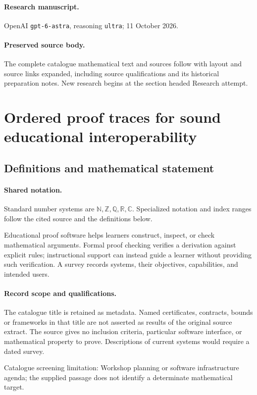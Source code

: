 \documentclass[11pt]{article}
\begin{document}
\paragraph{Research manuscript.} OpenAI \texttt{gpt-6-astra}, reasoning \texttt{ultra}; 11 October 2026.
\paragraph{Preserved source body.} The complete catalogue mathematical text and sources follow with layout and source links expanded, including source qualifications and its historical preparation notes. New research begins at the section headed Research attempt.

\section{Ordered proof traces for sound educational interoperability}\label{statement}

\subsection{Definitions and mathematical statement}

\paragraph{Shared notation.}Standard number systems are $\mathbb N,\mathbb Z,\mathbb Q,\mathbb R,\mathbb C$. Specialized notation and index ranges follow the cited source and the definitions below.


Educational proof software helps learners construct, inspect, or check mathematical arguments. Formal proof checking verifies a derivation against explicit rules; instructional support can instead guide a learner without providing such verification. A survey records systems, their objectives, capabilities, and intended users.
\paragraph{Record scope and qualifications.}
The catalogue title is retained as metadata. Named certificates, contracts, bounds or frameworks in that title are not asserted as results of the original source extract.
The source gives no inclusion criteria, particular software interface, or mathematical property to prove. Descriptions of current systems would require a dated survey.

Catalogue screening limitation: Workshop planning or software infrastructure agenda; the supplied passage does not identify a determinate mathematical target.
\end{document}
